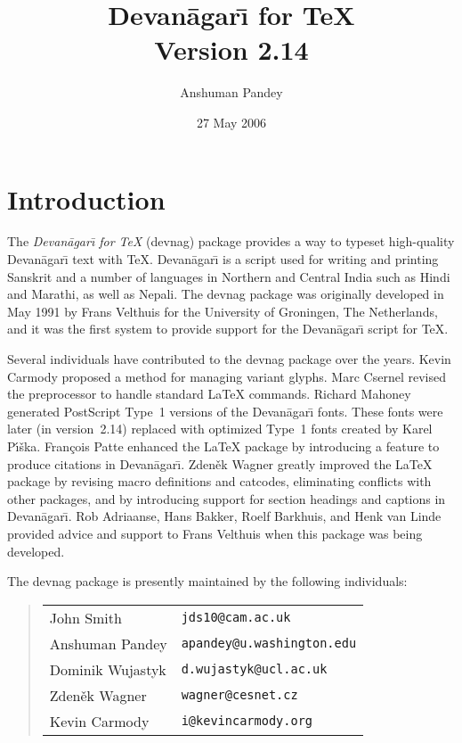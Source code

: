 \documentclass[10pt]{article}
\newcommand{\moddate}{27 May 2006}
\newcommand{\version}{2.14}
\newcommand{\devnag}{Devan\=agar{\=\i}}
\begin{document}
\pagestyle{fancy}
\fancyhf{}
\fancyfoot[C]{\thepage}

\fontsize{10}{13}\selectfont

\title{{\LARGE \bfseries \devnag{} for \TeX{}} \\ Version \version{}}
\author{Anshuman Pandey}
\date{\large \moddate{}}
\maketitle

\tableofcontents

\listoftables

\section{Introduction}

The \textit{\devnag{} for \TeX{}} (\textsf{devnag}) package provides a
way to typeset high-quality \devnag{} text with \TeX{}.
\devnag{} is a script used for writing and printing Sanskrit and
a number of languages in Northern and Central India such as Hindi and
Marathi, as well as Nepali. The \textsf{devnag} package was originally
developed in May 1991 by Frans Velthuis for the University of Groningen,
The Netherlands, and it was the first system to provide support for
the \devnag{} script for \TeX{}.

Several individuals have contributed to the \textsf{devnag} package
over the years. Kevin Carmody proposed a method for managing variant
glyphs. Marc Csernel revised the preprocessor to handle standard
\LaTeX{} commands. Richard Mahoney generated PostScript Type~1
versions of the \devnag{} fonts. These fonts were later (in version~2.14) replaced with optimized 
Type~1 fonts created by Karel P\'{\i}\v{s}ka. Fran\c{c}ois Patte enhanced the \LaTeX{} package by 
introducing
a feature to produce citations in \devnag{}. Zden\v{e}k Wagner greatly improved the \LaTeX{}
package by revising macro definitions and catcodes, eliminating
conflicts with other packages, and by introducing support for
section headings and captions in \devnag{}. Rob Adriaanse, Hans Bakker,
Roelf Barkhuis, and Henk van Linde provided advice and support
to Frans Velthuis when this package was being developed.

The \textsf{devnag} package is presently maintained by the following
individuals:

\begin{quote}
\begin{tabular}{ll}
John Smith         & \verb+jds10@cam.ac.uk+ \\
Anshuman Pandey    & \verb+apandey@u.washington.edu+ \\
Dominik Wujastyk   & \verb+d.wujastyk@ucl.ac.uk+ \\
Zden\v{e}k Wagner  & \verb+wagner@cesnet.cz+ \\
Kevin Carmody      & \verb+i@kevincarmody.org+
\end{tabular}
\end{quote}
\end{document}
